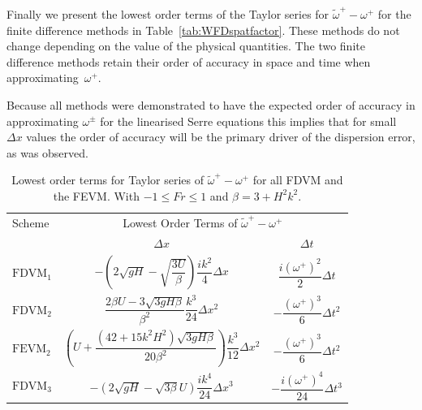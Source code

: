 Finally we present the lowest order terms of the Taylor series for ${\widetilde{\omega}^+-\omega^+}$ for the finite difference methods in Table~\ref{tab:WFDspatfactor}. These methods do not change depending on the value of the physical quantities. The two finite difference methods retain their order of accuracy in space and time when approximating~$\omega^+$.  

Because all methods were demonstrated to have the expected order of accuracy in approximating $\omega^\pm$ for the linearised Serre equations this implies that for small $\Delta x$ values the order of accuracy will be the primary driver of the dispersion error, as was observed.

\begin{table}
	\centering
	\begin{tabular}{l  c  c}
	\hline
		Scheme & \multicolumn{2}{c}{Lowest Order Terms of $\widetilde{\omega}^+-\omega^+$}\T\B \\
		\cline{2-3}
		& $\Delta x$&$\Delta t$\T\B \\
		\hline
		$\text{FDVM}_1$& $-\left(2 \sqrt{gH} - \sqrt{\dfrac{3U}{\beta }}\right)  \dfrac{ik^2}{4} \Delta x$ & $\dfrac{i \left(\omega^+\right)^2}{2} \Delta t$ \T\B \\
		$\text{FDVM}_2$& $\dfrac{2\beta U -3 \sqrt{3 gH \beta}}{\beta^2}  \dfrac{k^3}{24}\Delta x ^2$ & $- \dfrac{\left(\omega^+\right)^3}{6 }  \Delta t^2$ \T\B \\
		$\text{FEVM}_2$& $\left(U   + \dfrac{\left(42 + 15 k^2H^2\right) \sqrt{3gH \beta}}{20\beta^2}  \right) \dfrac{k^3}{12 } \Delta x^2$ &  $- \dfrac{\left(\omega^+\right)^3}{6 }  \Delta t^2$ \T\B \\
		$\text{FDVM}_3$& $-\left({2\sqrt{gH} - \sqrt{3\beta}U }\right) \dfrac{ik^4}{24} \Delta x^3$ & $-\dfrac{i\left(\omega^+\right)^4}{24 } \Delta t^3$ \T\B  \\ \hline
	\end{tabular}
	\caption{Lowest order terms for Taylor series of $\widetilde{\omega}^+-\omega^+$ for all FDVM and the FEVM. With $  -1 \le Fr \le 1$ and $\beta = 3 + H^2 k^2 $. }
	\label{tab:Wfactor} 
\end{table}

